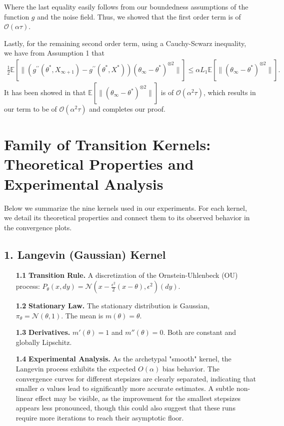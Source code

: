 \documentclass[a4paper]{article}
\newcommand{\norm}[1]{\|#1 \|}
\newcommand{\Exs}{\mathbb{E}}
\newcommand{\thetastar}{\theta^*}
\newcommand{\thetainf}{\theta_\infty}
\newcommand{\xstar}{X^*}
\newcommand{\xinfPone}{X_{\infty + 1}}
\newcommand{\stepsize}{\alpha}
\begin{document}
	 Where the last equality easily follows from our boundedness assumptions of the function $g$ and the noise field. Thus, we showed that the first order term is of $\mathcal{O}\left(\stepsize \tau\right)$.
	 
	 Lastly, for the remaining second order term, using a Cauchy-Scwarz inequality, we have from Assumption 1 that
	 \begin{align*}
		\frac{1}{2}\Exs\left[\norm{\left(g^{\prime\prime}\left(\thetastar, \xinfPone\right) - g^{\prime\prime}\left(\thetastar, \xstar\right)\right)\left(\thetainf - \thetastar\right)^{\otimes 2}}\right] \leq \stepsize L_{1}\Exs\left[\norm{\left(\thetainf - \thetastar\right)^{\otimes 2}}\right].
	 \end{align*}
	 It has been showed in \cite{huo2024collusion} that $\Exs\left[\norm{\left(\thetainf - \thetastar\right)^{\otimes 2}}\right]$ is of $\mathcal{O}\left(\stepsize^{2} \tau\right)$, which results in our term to be of $\mathcal{O}\left(\stepsize^{2}\tau\right)$ and completes our proof.
	 
\section*{Family of Transition Kernels: Theoretical Properties and Experimental Analysis}

Below we summarize the nine kernels used in our experiments. For each kernel, we detail its theoretical properties and connect them to its observed behavior in the convergence plots.

\subsection*{1. Langevin (Gaussian) Kernel}
\begin{itemize}
	\item[\bfseries 1.1] \textbf{Transition Rule.} A discretization of the Ornstein-Uhlenbeck (OU) process: \( P_\theta(x,dy) = \mathcal{N}\! \left( x - \tfrac{\epsilon^2}{2}(x-\theta), \epsilon^2 \right)(dy). \)
	\item[\bfseries 1.2] \textbf{Stationary Law.} The stationary distribution is Gaussian, \(\pi_\theta = \mathcal{N}(\theta,1)\). The mean is \(m(\theta)=\theta\).
	\item[\bfseries 1.3] \textbf{Derivatives.} \(m'(\theta)=1\) and \(m''(\theta)=0\). Both are constant and globally Lipschitz.
	\item[\bfseries 1.4] \textbf{Experimental Analysis.} As the archetypal "smooth" kernel, the Langevin process exhibits the expected \(O(\alpha)\) bias behavior. The convergence curves for different stepsizes are clearly separated, indicating that smaller \(\alpha\) values lead to significantly more accurate estimates. A subtle non-linear effect may be visible, as the improvement for the smallest stepsizes appears less pronounced, though this could also suggest that these runs require more iterations to reach their asymptotic floor.
\end{itemize}
\end{document}
